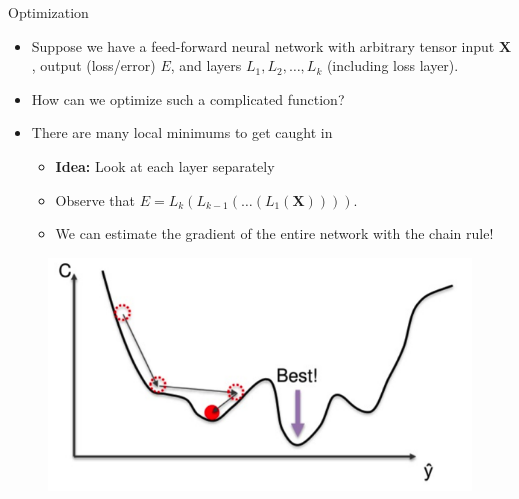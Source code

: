 \documentclass{beamer}
\begin{document}
\begin{frame}{Optimization}

    \begin{itemize}
        \item<1-> Suppose we have a feed-forward neural network with arbitrary tensor input $\bm{X}$, output (loss/error) $E$, and layers $L_1, L_2, \hdots, L_k$ (including loss layer).
        \item<1-> How can we optimize such a complicated function?
        \item<1-> There are many local minimums to get caught in
        \begin{itemize}
            \item<2-> {\bf Idea:} Look at each layer separately
            \item<2-> Observe that $E = L_k(L_{k-1} (\hdots (L_1(\bm{X}))))$.
            \item<2-> We can estimate the gradient of the entire network with the chain rule!
        \end{itemize}
    \end{itemize}

    \begin{figure}
        \includegraphics[width=.5\textwidth]{minimum}
    \end{figure}
\end{frame}
\end{document}
